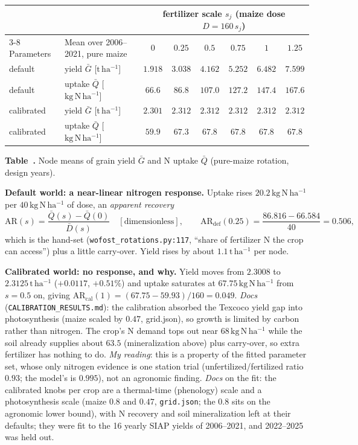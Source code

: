 \documentclass[11pt,a4paper]{article}
\newcommand{\code}[1]{\texttt{\nolinkurl{#1}}}
\newcommand{\codeline}[1]{\texttt{\detokenize{#1}}}   %
\newcommand{\tha}{\mathrm{t\,ha^{-1}}}
\newcommand{\kgNha}{\mathrm{kg\,N\,ha^{-1}}}
\renewenvironment{table}[1][]{\par\vspace{3pt}\begin{center}\footnotesize}{\end{center}\par\vspace{1pt}}
\renewcommand{\caption}[1]{\par\nopagebreak[4]\vspace{3pt}\refstepcounter{table}\noindent\parbox{0.94\linewidth}{\footnotesize\raggedright\textbf{Table~\thetable.} #1}\par\vspace{2pt}}
\begin{document}
\begin{table}[h]
\begin{tabular}{@{}llcccccc@{}}
\toprule
 & & \multicolumn{6}{c}{fertilizer scale $s_j$ (maize dose $D=160\,s_j$)} \\
\cmidrule(l){3-8}
Parameters & Mean over 2006--2021, pure maize & $0$ & $0.25$ & $0.5$ & $0.75$ & $1$ & $1.25$ \\
\midrule
default & yield $\bar G$ [$\mathrm{t\,ha^{-1}}$] & $1.918$ & $3.038$ & $4.162$ & $5.252$ & $6.482$ & $7.599$ \\
default & uptake $\bar Q$ [$\mathrm{kg\,N\,ha^{-1}}$] & $66.6$ & $86.8$ & $107.0$ & $127.2$ & $147.4$ & $167.6$ \\
calibrated & yield $\bar G$ [$\mathrm{t\,ha^{-1}}$] & $2.301$ & $2.312$ & $2.312$ & $2.312$ & $2.312$ & $2.312$ \\
calibrated & uptake $\bar Q$ [$\mathrm{kg\,N\,ha^{-1}}$] & $59.9$ & $67.3$ & $67.8$ & $67.8$ & $67.8$ & $67.8$ \\
\bottomrule
\end{tabular}
\caption{Node means of grain yield $\bar G$ and N uptake $\bar Q$ (pure-maize rotation, design years).}
\label{tab:nodes}
\end{table}

\textbf{Default world: a near-linear nitrogen response.} Uptake rises $20.2\,\kgNha$ per $40\,\kgNha$ of dose, an
\emph{apparent recovery}
\begin{equation}
\mathrm{AR}(s)=\frac{\bar Q(s)-\bar Q(0)}{\bar D(s)}\quad[\text{dimensionless}],\qquad
\mathrm{AR}_{\mathrm{def}}(0.25)=\frac{86.816-66.584}{40}=0.506,
\label{eq:ar}
\end{equation}
which is the hand-set \codeline{N_RECOVERY = 0.5} (\code{wofost_rotations.py:117}, ``share of fertilizer N the crop can access'')
plus a little carry-over. Yield rises by about $1.1\,\tha$ per node.

\textbf{Calibrated world: no response, and why.} Yield moves from $2.3008$ to $2.3125\,\tha$ ($+0.0117$, $+0.51\%$) and
uptake saturates at $67.75\,\kgNha$ from $s=0.5$ on, giving $\mathrm{AR}_{\mathrm{cal}}(1)=(67.75-59.93)/160=0.049$.
\emph{Docs} (\code{CALIBRATION_RESULTS.md}): the calibration absorbed the Texcoco yield gap into photosynthesis (maize scaled
by $0.47$, grid.json), so growth is limited by carbon rather than nitrogen. The crop's N demand tops out near
$68\,\kgNha$ while the soil already supplies about $63.5$ (mineralization above) plus carry-over, so extra fertilizer has
nothing to do. \emph{My reading}: this is a property of the fitted parameter set, whose only nitrogen evidence is one
station trial (unfertilized/fertilized ratio $0.93$; the model's is $0.995$), not an agronomic finding.
\emph{Docs} on the fit: the calibrated knobs per crop are a thermal-time (phenology) scale and a photosynthesis scale (maize $0.8$ and $0.47$, \code{grid.json}; the $0.8$ sits on the agronomic lower bound), with N recovery and soil mineralization left at their defaults; they were fit to the 16 yearly SIAP yields of 2006--2021, and 2022--2025 was held out.
\end{document}
